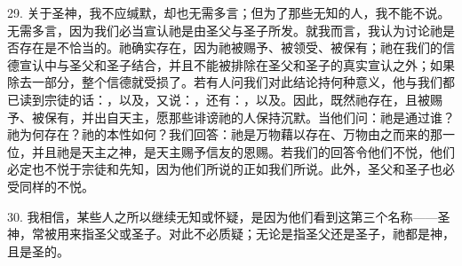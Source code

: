 29. 关于圣神，我不应缄默，却也无需多言；但为了那些无知的人，我不能不说。无需多言，因为我们必当宣认祂是由圣父与圣子所发。就我而言，我认为讨论祂是否存在是不恰当的。祂确实存在，因为祂被赐予、被领受、被保有；祂在我们的信德宣认中与圣父和圣子结合，并且不能被排除在圣父和圣子的真实宣认之外；如果除去一部分，整个信德就受损了。若有人问我们对此结论持何种意义，他与我们都已读到宗徒的话：，以及，又说：，还有：，以及。因此，既然祂存在，且被赐予、被保有，并出自天主，愿那些诽谤祂的人保持沉默。当他们问：祂是通过谁？祂为何存在？祂的本性如何？我们回答：祂是万物藉以存在、万物由之而来的那一位，并且祂是天主之神，是天主赐予信友的恩赐。若我们的回答令他们不悦，他们必定也不悦于宗徒和先知，因为他们所说的正如我们所说。此外，圣父和圣子也必受同样的不悦。\par

30. 我相信，某些人之所以继续无知或怀疑，是因为他们看到这第三个名称——圣神，常被用来指圣父或圣子。对此不必质疑；无论是指圣父还是圣子，祂都是神，且是圣的。\par

